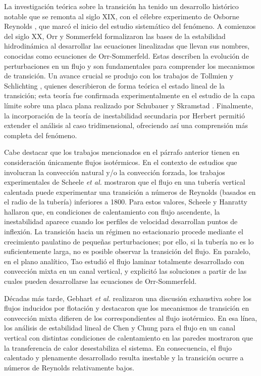 La investigación teórica sobre la transición ha tenido un desarrollo histórico notable que se remonta al siglo XIX, con el célebre experimento de Osborne Reynolds \cite{reynolds1883}, que marcó el inicio del estudio sistemático del fenómeno. A comienzos del siglo XX, Orr \cite{orr1907} y Sommerfeld \cite{sommerfeld1908} formalizaron las bases de la estabilidad hidrodinámica al desarrollar las ecuaciones linealizadas que llevan sus nombres, conocidas como ecuaciones de Orr-Sommerfeld. Estas describen la evolución de perturbaciones en un flujo y son fundamentales para comprender los mecanismos de transición. Un avance crucial se produjo con los trabajos de Tollmien \cite{tollmien1930} y Schlichting \cite{schlichting1933}, quienes describieron de forma teórica el estado lineal de la transición; esta teoría fue confirmada experimentalmente en el estudio de la capa límite sobre una placa plana realizado por Schubauer y Skramstad \cite{schubauer1947laminar}. Finalmente, la incorporación de la teoría de inestabilidad secundaria por Herbert \cite{herbert1983secondary} permitió extender el análisis al caso tridimensional, ofreciendo así una comprensión más completa del fenómeno. 

Cabe destacar que los trabajos mencionados en el párrafo anterior tienen en consideración únicamente flujos isotérmicos. En el contexto de estudios que involucran la convección natural y/o la convección forzada, los trabajos experimentales de Scheele \textit{et al.}  \cite{scheele1960effect, scheele1962effect} mostraron que el flujo en una tubería vertical calentada puede experimentar una transición a números de Reynolds (basados en el radio de la tubería) inferiores a 1800. Para estos valores, Scheele y \linebreak  Hanratty \cite{scheele1962effect} hallaron que, en condiciones de calentamiento con flujo ascendente, la inestabilidad aparece cuando los perfiles de velocidad \linebreak  desarrollan puntos de inflexión. La transición hacia un régimen no estacionario procede mediante el crecimiento paulatino de pequeñas perturbaciones; por ello, si la tubería no es lo suficientemente larga, no es posible observar la transición del flujo. En paralelo, en el plano analítico, Tao \cite{tao1960} estudió el flujo laminar totalmente desarrollado con convección mixta en un canal vertical, y explicitó las soluciones a partir de las cuales pueden desarrollarse las ecuaciones de Orr-Sommerfeld.

Décadas más tarde, Gebhart \textit{et al.} \cite{gebhart1989buoyancy} realizaron una discusión exhaustiva sobre los flujos inducidos por flotación y destacaron que los mecanismos de transición en convección mixta difieren de los correspondientes al flujo isotérmico. En esa línea, los análisis de estabilidad lineal de Chen y Chung para el flujo en un canal vertical con distintas condiciones de calentamiento en las paredes \cite{chen1996linear,chen1998stability} mostraron que la transferencia de calor desestabiliza el sistema. En consecuencia, el flujo calentado y plenamente desarrollado resulta inestable y la transición ocurre a números de Reynolds relativamente bajos.

